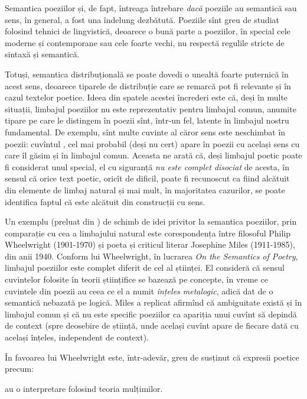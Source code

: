 Semantica poeziilor și, de fapt, întreaga întrebare \emph{dacă} poeziile
au semantică sau sens, în general, a fost una îndelung dezbătută. Poeziile
sînt greu de studiat folosind tehnici de lingvistică, deoarece o bună parte
a poeziilor, în special cele moderne și contemporane sau cele foarte vechi,
nu respectă regulile stricte de sintaxă și semantică.

Totuși, semantica distribuțională se poate dovedi o unealtă foarte puternică în
acest sens, deoarece tiparele de distribuție care se remarcă pot fi relevante
și în cazul textelor poetice. Ideea din spatele acestei încrederi este că,
deși în multe situații, limbajul poeziilor nu este reprezentativ pentru
limbajul comun, anumite tipare pe care le distingem în poezii sînt, într-un fel,
latente în limbajul nostru fundamental. De exemplu, sînt multe cuvinte al
căror sens este neschimbat în poezii: cuvîntul , cel mai probabil
(deși nu cert) apare în poezii cu același sens cu care îl găsim și în
limbajul comun. Aceasta ne arată că, deși limbajul poetic poate fi considerat
unul special, el cu siguranță \emph{nu este complet disociat} de acesta, în
sensul că orice text poetic, oricît de dificil, poate fi recunoscut ca fiind
alcătuit din elemente de limbaj natural și mai mult, în majoritatea cazurilor,
se poate identifica faptul că este alcătuit din construcții cu sens.

Un exemplu (preluat din \cite{herbelot}) de schimb de idei privitor la semantica
poeziilor, prin comparație cu cea a limbajului natural este corespondența
între filosoful Philip Wheelwright (1901-1970) și poeta și criticul literar
Josephine Miles (1911-1985), din anii 1940. Conform lui Wheelwright, în lucrarea
\emph{On the Semantics of Poetry}, limbajul poeziilor este complet diferit de
cel al științei. El consideră că sensul cuvintelor folosite în teorii științifice
se bazează pe concepte, în vreme ce cuvintele din poezii au ceea ce el a numit
\emph{înțeles metalogic}, adică dat de o semantică nebazată pe logică.
Miles a replicat afirmînd că ambiguitate există și în limbajul comun și că nu
este specific poeziilor ca apariția unui cuvînt să depindă de context (spre
deosebire de știință, unde același cuvînt apare de fiecare dată cu același
înțeles, independent de context).

În favoarea lui Wheelwright este, într-adevăr, greu de susținut că expresii
poetice precum:
\begin{itemize}
\item ``{\emph{Music is the exquisite knocking of the blood}'' (Rupert Brooke);
\item ``\emph{Your huge mortgage of hope}'' (Ted Hughes);
\item ``\emph{Skeleton bells of trees}'' (Avery Slater)
\end{itemize}
au o interpretare folosind teoria mulțimilor.

